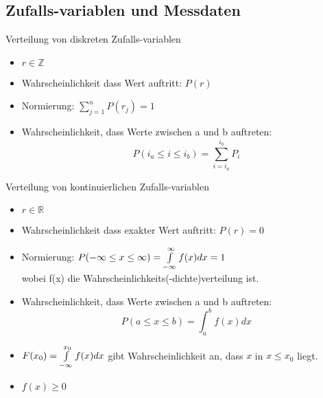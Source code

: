 \documentclass[10pt,a4paper]{article}
\begin{document}
\subsection{Zufalls-variablen und Messdaten}
Verteilung von diskreten Zufalls-variablen
\begin{itemize}
\item $r \in \mathbb{Z}$
\item Wahrscheinlichkeit dass Wert auftritt: $P(r)$
\item Normierung: $\sum^{n}_{j=1}P(r_j)=1$
\item Wahrscheinlichkeit, dass Werte zwischen a und b auftreten:
\begin{equation}
P(i_a \le i \le i_b) = \sum^{i_b}_{i=i_a}P_i
\end{equation}
\end{itemize}
Verteilung von kontinuierlichen Zufalls-variablen
\begin{itemize}
\item $r \in \mathbb{R}$
\item Wahrscheinlichkeit dass exakter Wert auftritt: $P(r)=0$
\item Normierung: $P(-\infty \le x \le \infty) = \int^{\infty}_{-\infty}\limits {f(x)dx}=1$ \\ wobei f(x) die Wahrscheinlichkeits(-dichte)verteilung ist.
\item Wahrscheinlichkeit, dass Werte zwischen a und b auftreten:
\begin{equation}
P(a \le x \le b) = \int^{b}_{a} {f(x)dx}
\end{equation}
\item $F(x_0)=\int^{x_0}_{-\infty}\limits {f(x)dx}$ gibt Wahrscheinlichkeit an, dass $x$ in $x \le x_0$ liegt.
\item $f(x) \ge 0$
\end{itemize}

\newpage
\end{document}
